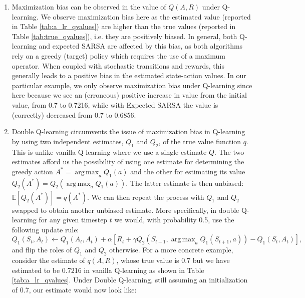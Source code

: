 \documentclass{article}
\DeclareMathOperator*{\argmax}{arg\,max}
\begin{document}
\begin{enumerate}
\begin{table}[ht]
\begin{tabular}{@{}cccccc@{}}
		      \end{tabular}
	      \end{table}
	\item Maximization bias can be observed in the value of $Q(A, R)$ under Q-learning. We observe
	      maximization bias here as the estimated value (reported in Table \ref{tab:a_lr_qvalues}) are
	      higher than the true values (reported in Table \ref{tab:true_qvalues}), i.e. they are positively
	      biased. In general, both Q-learning and expected SARSA are affected by this bias, as both
	      algorithms rely on a greedy (target) policy which requires the use of a maximum operator. When
	      coupled with stochastic transitions and rewards, this generally leads to a positive bias in the
	      estimated state-action values. In our particular example, we only observe maximization bias
	      under Q-learning since here because we see an (erroneous) positive increase in value from the
	      initial value, from 0.7 to 0.7216, while with Expected SARSA the value is (correctly) decreased
	      from 0.7 to 0.6856.
	\item Double Q-learning circumvents the issue of maximization bias in Q-learning by using two
	      independent estimates, $Q_1$ and $Q_2$, of the true value function $q$. This is unlike
	      vanilla Q-learning where we use a single estimate $Q$. The two estimates afford us the
	      possibility of using one estimate for determining the greedy action $A^* = \argmax_aQ_1(a)$
	      and the other for estimating its value $Q_2(A^*) = Q_2(\argmax_aQ_1(a))$. The latter estimate
	      is then unbiased: $\mathbb{E}\left[Q_2(A^*)\right] = q(A^*)$. We can then repeat the process
	      with $Q_1$ and $Q_2$ swapped to obtain another unbiased estimate. More specifically, in
	      double Q-learning for any given timestep $t$ we would, with probability 0.5, use the
	      following update rule:
	      \begin{equation}
		      Q_1(S_t, A_t) \leftarrow Q_1(A_t, A_t) + \alpha \left[ R_t + \gamma Q_2(S_{t+1},
			      \argmax_{a}Q_1(S_{t+1}, a)) - Q_1(S_t, A_t) \right],
	      \end{equation}
	      and flip the roles of $Q_1$ and $Q_2$ otherwise. For a more concrete example, consider the
	      estimate of $q(A, R)$, whose true value is 0.7 but we have estimated to be 0.7216 in
	      vanilla Q-learning as shown in Table \ref{tab:a_lr_qvalues}. Under Double Q-learning, still
	      assuming an initialization of 0.7, our estimate would now look like:
	      \begin{align*}

\end{align*}
\end{enumerate}
\end{document}
